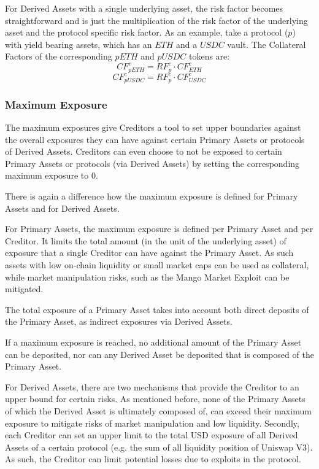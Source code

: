 \documentclass[sigconf,nonacm]{acmart}
\begin{document}
For Derived Assets with a single underlying asset,
the risk factor becomes straightforward and is just the multiplication of the risk factor of the underlying asset and the protocol specific risk factor.
As an example, take a protocol ($p$) with yield bearing assets, which has an $ETH$ and a $USDC$ vault.
The Collateral Factors of the corresponding $pETH$ and $pUSDC$ tokens are:
\begin{equation}
    CF_{pETH}^{c} = RF_{p}^{c} \cdot CF_{ETH}^{c}
\end{equation}
\begin{equation}
    CF_{pUSDC}^{c} = RF_{p}^{c} \cdot CF_{USDC}^{c}
\end{equation}

\subsubsection{Maximum Exposure}
The maximum exposures give Creditors a tool to set upper boundaries against the overall exposures they can have against certain Primary Assets or protocols of Derived Assets.
Creditors can even choose to not be exposed to certain Primary Assets or protocols (via Derived Assets) by setting the corresponding maximum exposure to 0.

There is again a difference how the maximum exposure is defined for Primary Assets and for Derived Assets.

For Primary Assets, the maximum exposure is defined per Primary Asset and per Creditor.
It limits the total amount (in the unit of the underlying asset) of exposure that a single Creditor can have against the Primary Asset.
As such assets with low on-chain liquidity or small market caps can be used as collateral,
while market manipulation risks, such as the Mango Market Exploit\cite{coindeskDeFiExchange} can be mitigated.

The total exposure of a Primary Asset takes into account both direct deposits of the Primary Asset, as indirect exposures via Derived Assets.

If a maximum exposure is reached, no additional amount of the Primary Asset can be deposited,
nor can any Derived Asset be deposited that is composed of the Primary Asset.

For Derived Assets, there are two mechanisms that provide the Creditor to an upper bound for certain risks.
As mentioned before, none of the Primary Assets of which the Derived Asset is ultimately composed of, can exceed their maximum exposure to mitigate risks of market manipulation and low liquidity.
Secondly, each Creditor can set an upper limit to the total USD exposure of all Derived Assets of a certain protocol (e.g. the sum of all liquidity position of Uniswap V3).
As such, the Creditor can limit potential losses due to exploits in the protocol.
\end{document}
